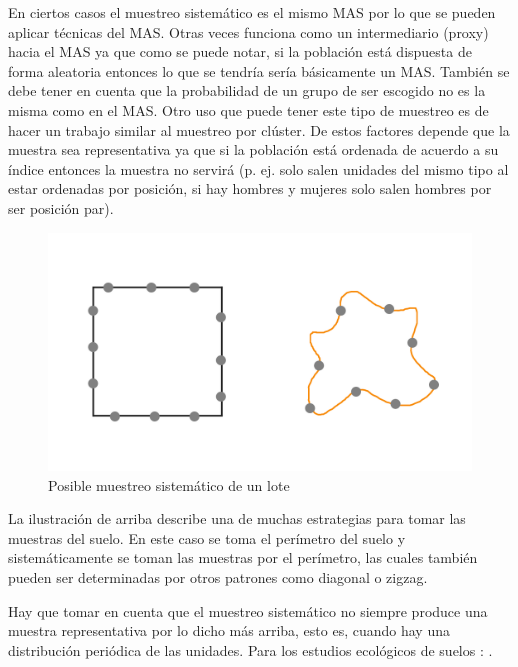 \documentclass[conference]{IEEEtran}
\begin{document}
\bigbreak

En ciertos casos el muestreo sistemático es el mismo MAS por lo que se pueden aplicar técnicas del MAS. Otras veces funciona como un intermediario (proxy) hacia el MAS ya que como se puede notar, si la población está dispuesta de forma aleatoria entonces lo que se tendría sería básicamente un MAS. También se debe tener en cuenta que la probabilidad de un grupo de ser escogido no es la misma como en el MAS. Otro uso que puede tener este tipo de muestreo es de hacer un trabajo similar al muestreo por clúster. De estos factores depende que la muestra sea representativa ya que si la población está ordenada de acuerdo a su índice entonces la muestra no servirá (p. ej. solo salen unidades del mismo tipo al estar ordenadas por posición, si hay hombres y mujeres solo salen hombres por ser posición par). 

\bigbreak

\begin{figure}[H]
    \centering
    \includegraphics[width=0.3\paperwidth]{img/soil-systematic-sampling.png}
    \caption{Posible muestreo sistemático de un lote}
\end{figure}

La ilustración de arriba describe una de muchas estrategias \cite{lassaga-2011} \cite{gobpe-ministerio-del-ambiente-2014} para tomar las muestras del suelo. En este caso se toma el perímetro del suelo y sistemáticamente se toman las muestras por el perímetro, las cuales también pueden ser determinadas por otros patrones como diagonal o zigzag.

\bigbreak

Hay que tomar en cuenta que el muestreo sistemático no siempre produce una muestra representativa por lo dicho más arriba, esto es, cuando hay una distribución periódica de las unidades. Para los estudios ecológicos de suelos \cite{lohr-2009}: .
\end{document}
